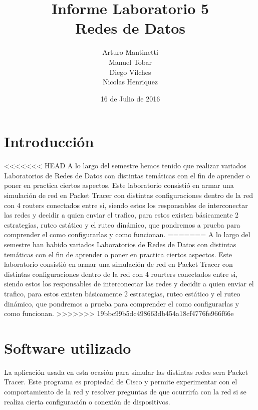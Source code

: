 \documentclass[spanish]{udpreport}
\title{Informe Laboratorio 5 \\ Redes de Datos}
\author{Arturo Mantinetti \\ Manuel Tobar \\ Diego Vilches \\ Nicolas Henriquez}
\date{16 de Julio de 2016}
\begin{document}
\maketitle

\tableofcontents

\chapter{Introducción}

<<<<<<< HEAD
A lo largo del semestre hemos tenido que realizar variados Laboratorios de Redes de Datos con distintas temáticas con el fin de aprender o poner en practica ciertos aspectos.
Este laboratorio consistió en armar una simulación de red en Packet Tracer con distintas configuraciones dentro de la red con 4 routers conectados entre si, siendo estos los responsables de interconectar las redes y decidir a quien enviar el trafico, para estos existen básicamente 2 estrategias, ruteo estático y el ruteo dinámico, que pondremos a prueba para comprender el como configurarlas y como funcionan.
=======
A lo largo del semestre han habido variados Laboratorios de Redes de Datos con distintas temáticas con el fin de aprender o poner en practica ciertos aspectos.
Este laboratorio consistió en armar una simulación de red en Packet Tracer con distintas configuraciones dentro de la red con 4 rourters conectados entre si, siendo estos los responsables de interconectar las redes y decidir a quien enviar el trafico, para estos existen básicamente 2 estrategias, ruteo estático y el ruteo dinámico, que pondremos a prueba para comprender el como configurarlas y como funcionan.
>>>>>>> 19bbc99b5dc498663db454a18cf4776fe966f66e

\chapter{Software utilizado}
La aplicación usada en esta ocasión para simular las distintas redes sera Packet Tracer. Este programa es propiedad de Cisco y permite experimentar con el comportamiento de la red y resolver preguntas de que ocurriría con la red si se realiza cierta configuración o conexión de dispositivos.
\end{document}
